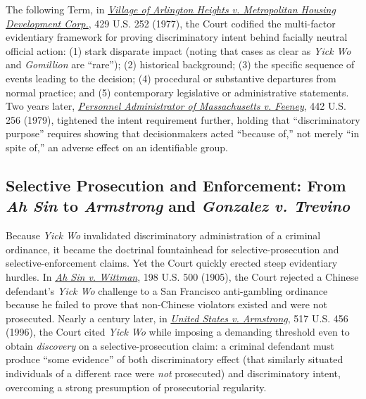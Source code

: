 \documentclass[12pt]{article}
\begin{document}
The following Term, in \href{https://supreme.justia.com/cases/federal/us/429/252/}{\emph{Village of Arlington Heights v. Metropolitan Housing Development Corp.}}, 429 U.S. 252 (1977), the Court codified the multi-factor evidentiary framework for proving discriminatory intent behind facially neutral official action: (1) stark disparate impact (noting that cases as clear as \emph{Yick Wo} and \emph{Gomillion} are ``rare''); (2) historical background; (3) the specific sequence of events leading to the decision; (4) procedural or substantive departures from normal practice; and (5) contemporary legislative or administrative statements. Two years later, \href{https://supreme.justia.com/cases/federal/us/442/256/}{\emph{Personnel Administrator of Massachusetts v. Feeney}}, 442 U.S. 256 (1979), tightened the intent requirement further, holding that ``discriminatory purpose'' requires showing that decisionmakers acted ``because of,'' not merely ``in spite of,'' an adverse effect on an identifiable group.

\subsection{Selective Prosecution and Enforcement: From \emph{Ah Sin} to \emph{Armstrong} and \emph{Gonzalez v. Trevino}}
Because \emph{Yick Wo} invalidated discriminatory administration of a criminal ordinance, it became the doctrinal fountainhead for selective-prosecution and selective-enforcement claims. Yet the Court quickly erected steep evidentiary hurdles. In \href{https://supreme.justia.com/cases/federal/us/198/500/}{\emph{Ah Sin v. Wittman}}, 198 U.S. 500 (1905), the Court rejected a Chinese defendant's \emph{Yick Wo} challenge to a San Francisco anti-gambling ordinance because he failed to prove that non-Chinese violators existed and were not prosecuted. Nearly a century later, in \href{https://supreme.justia.com/cases/federal/us/517/456/}{\emph{United States v. Armstrong}}, 517 U.S. 456 (1996), the Court cited \emph{Yick Wo} while imposing a demanding threshold even to obtain \emph{discovery} on a selective-prosecution claim: a criminal defendant must produce ``some evidence'' of both discriminatory effect (that similarly situated individuals of a different race were \emph{not} prosecuted) and discriminatory intent, overcoming a strong presumption of prosecutorial regularity.
\end{document}
